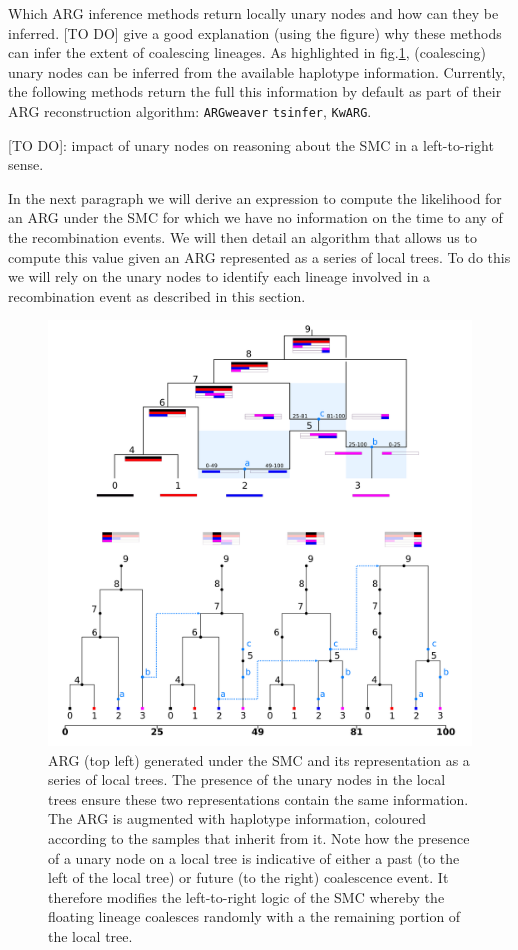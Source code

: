 \documentclass{article}
\newcommand{\tsinfer}[0]{\texttt{tsinfer}}
\newcommand{\kwarg}[0]{\texttt{KwARG}}
\newcommand{\argweaver}[0]{\texttt{ARGweaver}}
\begin{document}
Which ARG inference methods return locally unary nodes and how can they be inferred.
[TO DO] give a good explanation (using the figure) why these methods can infer the extent 
of coalescing lineages.
As highlighted in fig.\ref{fig:smc-unary}, (coalescing) unary nodes can be inferred 
from the available haplotype information. Currently, the following methods 
return the full this information by default as part of their ARG reconstruction algorithm: 
\argweaver \citep{rasmussen_genome-wide_2014} 
\tsinfer \citep{kelleher_inferring_2019}, 
\kwarg \citep{ignatieva_kwarg_2021}.


[TO DO]: impact of unary nodes on reasoning about the SMC in a left-to-right sense.

In the next paragraph we will derive an expression to compute the 
likelihood for an ARG under the SMC for which we have no information on the 
time to any of the recombination events. We will then detail an algorithm 
that allows us to compute this value given an ARG 
represented as a series of local trees. To do this we will rely on the unary nodes 
to identify each lineage involved in a recombination event 
as described in this section.


\begin{figure}[!ht]
\centering
\includegraphics[width=\textwidth]{figures/smc_custom_2rows_area.png}
\caption{ARG (top left) generated under the SMC and its representation as a 
series of local trees. The presence of the unary nodes in the local trees 
ensure these two representations contain the same information. 
The ARG is augmented with haplotype information, coloured according to the 
samples that inherit from it. 
Note how the presence of a unary node on a local tree is 
indicative of either a past (to the left of the local tree) 
or future (to the right) coalescence event. It therefore modifies the 
left-to-right logic of the SMC whereby the floating lineage coalesces randomly
with a the remaining portion of the local tree. 
}
\label{fig:smc-unary}
\end{figure}
\end{document}
